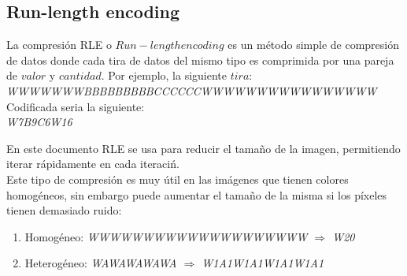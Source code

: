


\subsection{Run-length encoding}
La compresi\'on RLE o $Run-length encoding$ es un m\'etodo simple de compresión de datos donde cada tira de datos del mismo tipo es comprimida por una pareja de $valor$ y $cantidad$. Por ejemplo, la siguiente $tira$: \\

\textit{WWWWWWWBBBBBBBBBCCCCCCWWWWWWWWWWWWWWWW} \\

Codificada seria la siguiente: \\
\textit{W7B9C6W16}

En este documento RLE se usa para reducir el tama\~no de la imagen, permitiendo iterar r\'apidamente en cada iteraci\'n. \\

Este tipo de compresión es muy útil en las imágenes que tienen colores homogéneos, sin embargo puede aumentar el tama\~no de la misma si los p\'ixeles tienen demasiado ruido: \\

\begin{enumerate}
	\item Homog\'eneo: \textit{WWWWWWWWWWWWWWWWWWWW $\Rightarrow$ W20} \\
	\item Heterog\'eneo: \textit{WAWAWAWAWA $\Rightarrow$ W1A1W1A1W1A1W1A1} \\
\end{enumerate}

